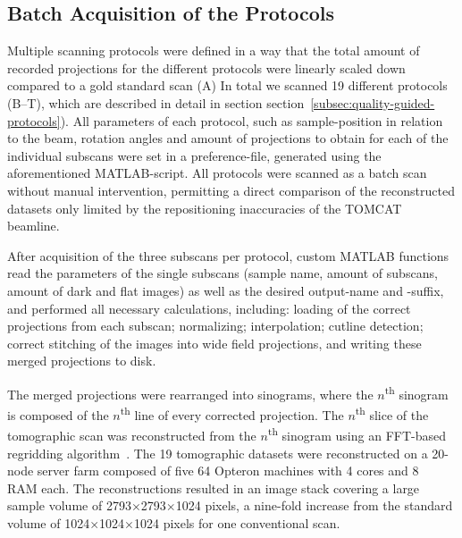 \subsection{Batch Acquisition of the Protocols}
Multiple scanning protocols were defined in a way that the total amount of recorded projections for the different protocols were linearly scaled down compared to a gold standard scan \cbstart (A) In total we scanned 19 different protocols (B--T), which are described in detail in section \cbend section~\ref{subsec:quality-guided-protocols}). All parameters of each protocol, such as sample-position in relation to the beam, rotation angles and amount of projections to obtain for each of the individual subscans were set in a preference-file, generated using the aforementioned MATLAB-script. All protocols \cbdelete were scanned as a batch scan without manual intervention, permitting a direct comparison of the reconstructed datasets only limited by the repositioning inaccuracies of the TOMCAT beamline.

After acquisition of the three subscans per protocol, custom MATLAB functions read the parameters of the single subscans (\eg sample name, amount of subscans, amount of dark and flat images) as well as the desired output-name and -suffix, and performed all necessary calculations, including: loading of the correct projections from each subscan; normalizing; interpolation; cutline detection; correct stitching of the images into wide field projections, and writing these merged projections to disk.

The merged projections were rearranged into sinograms, where the $n$\textsuperscript{th} sinogram is composed of the $n$\textsuperscript{th} line of every corrected projection. The $n$\textsuperscript{th} slice of the tomographic scan was reconstructed from the $n$\textsuperscript{th} sinogram using an FFT-based regridding algorithm~\cite{Dowd1999}. The 19 tomographic datasets were reconstructed on a 20-node server farm composed of five \SI{64}{\bit} Opteron machines with 4 cores and \SI{8}{\giga\byte} RAM each. The reconstructions resulted in an image stack covering a large sample volume of 2793$\times$2793$\times$1024 pixels, a nine-fold increase from the standard volume of 1024$\times$1024$\times$1024 pixels for one conventional scan.